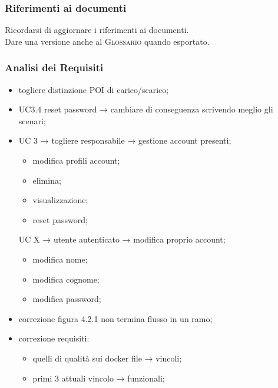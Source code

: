 \subsubsection{Riferimenti ai documenti}
Ricordarsi di aggiornare i riferimenti ai documenti.\\
Dare una versione anche al \textsc{Glossario} quando esportato.

\subsubsection{Analisi dei Requisiti}
\begin{itemize}
	\item togliere distinzione POI di carico/scarico;
	
	\item UC3.4 reset password → cambiare di conseguenza scrivendo meglio gli scenari;
	
	\item UC 3 → togliere responsabile → gestione account presenti;
	\begin{itemize}
		\item modifica profili account;
		
		\item elimina;
		
		\item visualizzazione;
		
		\item reset password;
	\end{itemize}
	UC X → utente autenticato → modifica proprio account;
	\begin{itemize}
		\item modifica nome;
		
		\item modifica cognome;
		
		\item modifica password;
	\end{itemize}
	\item correzione figura 4.2.1 non termina flusso in un ramo;
	
	\item correzione requisiti:
	\begin{itemize}
		\item quelli di qualità sui docker file → vincoli;
		\item primi 3 attuali vincolo → funzionali;
	\end{itemize}
\end{itemize}

